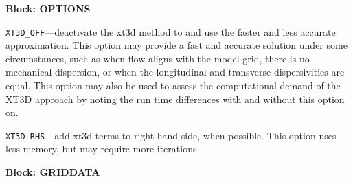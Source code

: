 
\item \textbf{Block: OPTIONS}

\begin{description}
\item \texttt{XT3D\_OFF}---deactivate the xt3d method to and use the faster and less accurate approximation.  This option may provide a fast and accurate solution under some circumstances, such as when flow aligns with the model grid, there is no mechanical dispersion, or when the longitudinal and transverse dispersivities are equal.  This option may also be used to assess the computational demand of the XT3D approach by noting the run time differences with and without this option on.

\item \texttt{XT3D\_RHS}---add xt3d terms to right-hand side, when possible.  This option uses less memory, but may require more iterations.

\end{description}
\item \textbf{Block: GRIDDATA}

